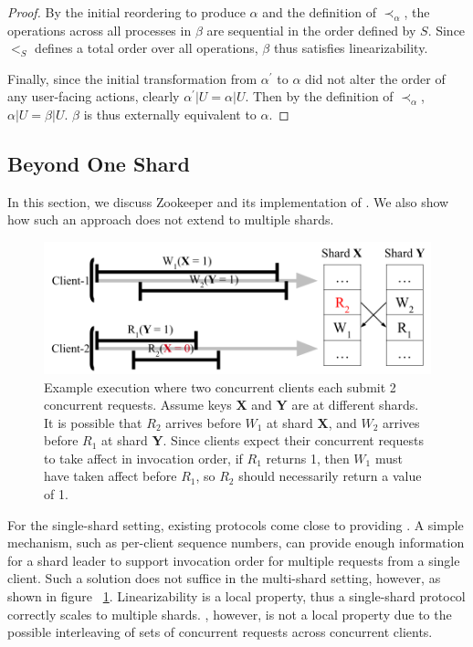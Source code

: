 \begin{proof}
By the initial reordering to produce $\alpha$ and the definition of
$\prec_{\alpha}$, the operations across all processes in $\beta$
are sequential in the order defined by $S$. Since $<_S$ defines a
total order over all operations, $\beta$ thus satisfies linearizability.

Finally, since the initial transformation from $\alpha^\prime$ to $\alpha$
did not alter the order of any user-facing actions, clearly
$\alpha^\prime | U = \alpha | U$. Then by the definition of $\prec_{\alpha}$, 
$\alpha | U = \beta | U$. $\beta$ is thus externally equivalent to $\alpha$.
\end{proof}

\subsection{\MDL{} Beyond One Shard}
\label{sec:mdl:zookeeper}

In this section, we discuss Zookeeper and its implementation of \SDL{}.
We also show how such an approach does not extend to multiple shards.

\begin{figure}[!htb]
    \includegraphics[scale=.45]{figs/somet.png}
    \caption{Example execution where two concurrent clients each submit 2 concurrent requests. Assume keys \textbf{X} and \textbf{Y} are at different shards. It is possible that $R_2$ arrives before $W_1$ at shard \textbf{X}, and $W_2$ arrives before $R_1$ at shard \textbf{Y}. Since clients expect their concurrent requests to take affect in invocation order, if $R_1$ returns 1, then $W_1$ must have taken affect before $R_1$, so $R_2$ should necessarily return a value of 1.}
    \label{fig:concurrentbatches}
\end{figure}

For the single-shard setting, existing protocols come close to providing \MDL{}. A simple mechanism, such as per-client sequence numbers, can provide enough information for a shard leader to support invocation order for multiple requests from a single client. Such a solution does not suffice in the multi-shard setting, however, as shown in figure ~\ref{fig:concurrentbatches}. Linearizability is a local property, thus a single-shard protocol correctly scales to multiple shards. \MDL{}, however, is not a local property due to the possible interleaving of sets of concurrent requests across concurrent clients.

